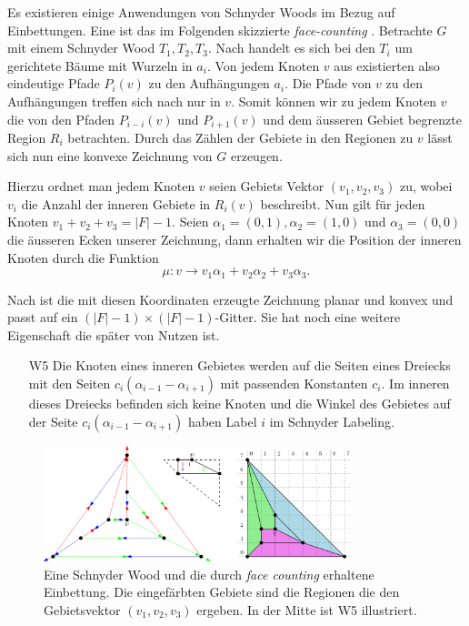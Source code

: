 Es existieren einige Anwendungen von Schnyder Woods im Bezug auf Einbettungen. Eine ist das im Folgenden skizzierte \textit{face-counting} \cite{felsner01}. Betrachte $G$ mit einem Schnyder Wood $T_1,T_2,T_3$. Nach \cite[Korollar 2.5]{felsner04} handelt es sich bei den $T_i$ um gerichtete Bäume mit Wurzeln in $a_i$. Von jedem Knoten $v$ aus existierten also eindeutige Pfade $P_i(v)$ zu den Aufhängungen $a_i$. Die Pfade von $v$ zu den Aufhängungen treffen sich nach \cite[Lemma 2.4]{felsner04} nur in $v$. Somit können wir zu jedem Knoten $v$ die von den Pfaden $P_{i-i}(v)$ und $P_{i+1}(v)$ und dem äusseren Gebiet begrenzte Region $R_i$ betrachten. Durch das Zählen der Gebiete in den Regionen zu $v$ lässt sich nun eine konvexe Zeichnung von $G$ erzeugen. \

Hierzu ordnet man jedem Knoten $v$ seien Gebiets Vektor $(v_1,v_2,v_3)$ zu, wobei $v_i$ die Anzahl der inneren Gebiete in $R_i(v)$ beschreibt. Nun gilt für jeden Knoten $v_1+v_2+v_3 = |F|-1$. Seien $\alpha_1 = (0,1),\alpha_2 = (1,0)$ und $\alpha_3 = (0,0)$ die äusseren Ecken unserer Zeichnung, dann erhalten wir die Position der inneren Knoten durch die Funktion 
$$\mu:v\to v_1\alpha_1 + v_2\alpha_2+v_3\alpha_3.$$ 

Nach \cite[Theorem 2.7]{felsner04} ist die mit diesen Koordinaten erzeugte Zeichnung planar und konvex und passt auf ein $(|F|-1)\times(|F|-1)$-Gitter. Sie hat noch eine weitere Eigenschaft die später von Nutzen ist.

\begin{itemize}
\item [W5] Die Knoten eines inneren Gebietes werden auf die Seiten eines Dreiecks mit den Seiten $c_i(\alpha_{i-1}-\alpha_{i+1})$ mit passenden Konstanten $c_i$. Im inneren dieses Dreiecks befinden sich keine Knoten und die Winkel des Gebietes auf der Seite $c_i(\alpha_{i-1}-\alpha_{i+1})$ haben Label $i$ im Schnyder Labeling.
\end{itemize}

\begin{figure}[h]
	\centering
  \includegraphics[width=0.8\textwidth]{face_counting.png}
	\caption{Eine Schnyder Wood und die durch \textit{face counting} erhaltene Einbettung. Die eingefärbten Gebiete sind die Regionen die den Gebietsvektor $(v_1,v_2,v_3)$ ergeben. In der Mitte ist W5 illustriert.}
	\label{face_counting}
\end{figure}
